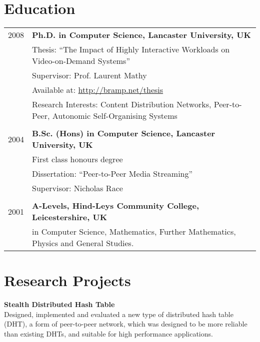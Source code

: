 \documentclass[a4paper,10pt]{article}
\begin{document}
\begin{tabular}{r|p{13.5cm}}

\end{tabular}

\section{Education}
\begin{tabular}{rp{14cm}}	
 \textsc{2008} & \textbf{Ph.D. in Computer Science, Lancaster University, UK}\\
& Thesis: ``The Impact of Highly Interactive Workloads on Video-on-Demand Systems''\\
& Supervisor: Prof. Laurent Mathy\\
& Available at: \href{http://bramp.net/thesis}{http://bramp.net/thesis}\\
& Research Interests: Content Distribution Networks, Peer-to-Peer, Autonomic Self-Organising Systems\\
&\\

\textsc{2004} & \textbf{B.Sc. (Hons) in Computer Science, Lancaster University, UK}\\
& First class honours degree\\
& Dissertation: ``Peer-to-Peer Media Streaming''\\
& Supervisor: Nicholas Race\\
&\\

\textsc{2001} & \textbf{A-Levels, Hind-Leys Community College, Leicestershire, UK}\\
& in Computer Science, Mathematics, Further Mathematics, Physics and General Studies.\\

\end{tabular}

\nocite{jakeman2009fna,faulkner2009epn,macquire2008acf,brampton2008cew,macquire2008asd,brampton2007cui,rai2007pmp,brampton2006sdh,macquire2006asd,macquire2006pas,brampton2005sdh}

\section{Research Projects}
 \textbf{Stealth Distributed Hash Table}\\
 Designed, implemented and evaluated a new type of distributed hash table (DHT), a form of peer-to-peer network, which was designed to be more reliable than existing DHTs, and suitable for high performance applications.
\end{document}
